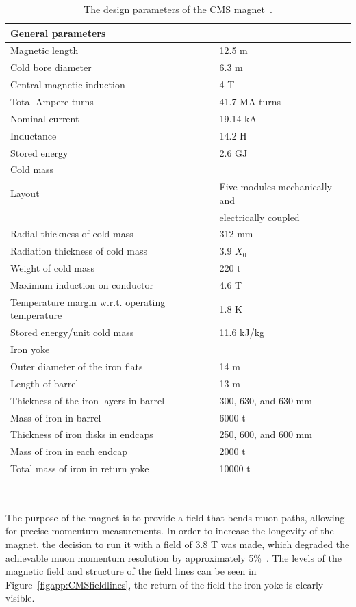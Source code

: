 \begin{table}[!Hhtbp]
\centering
\begin{tabular}{ll}
\hline
\hline
{General parameters} & {}\\
\hline
{Magnetic length} & {12.5 m}\\
{Cold bore diameter} & {6.3 m}\\
{Central magnetic induction} & {4 T}\\
{Total Ampere-turns} & {41.7 MA-turns}\\
{Nominal current} & {19.14 kA}\\
{Inductance} & {14.2 H}\\
{Stored energy} & {2.6 GJ}\\
\hline
\hline
{Cold mass} & {}\\
\hline
{Layout} & {Five modules mechanically and}\\
{} & {electrically coupled}\\
{Radial thickness of cold mass} & {312 mm}\\
{Radiation thickness of cold mass} & {3.9 $X_0$}\\
{Weight of cold mass} & {220 t}\\
{Maximum induction on conductor} & {4.6 T}\\
{Temperature margin w.r.t. operating temperature} & {1.8 K}\\
{Stored energy/unit cold mass} & {11.6 kJ/kg}\\
\hline
\hline
{Iron yoke} & {}\\
\hline
{Outer diameter of the iron flats} & {14 m}\\
{Length of barrel} & {13 m}\\
{Thickness of the iron layers in barrel} & {300, 630, and 630 mm}\\
{Mass of iron in barrel} & {6000 t}\\
{Thickness of iron disks in endcaps} & {250, 600, and 600 mm}\\
{Mass of iron in each endcap} & {2000 t}\\
{Total mass of iron in return yoke} & {10000 t}\\
\hline
\end{tabular}
\\
\caption[Parameters of the CMS magnet.]{The design parameters of the CMS magnet~\cite{CMSdetector}.}
\label{tab:CMSmagnetparams}
\end{table}

The purpose of the magnet is to provide a field that bends muon paths, allowing for precise momentum measurements.  In order to increase the longevity of the magnet, the decision to run it with a field of 3.8 T was made, which degraded the achievable muon momentum resolution by approximately 5\%~\cite{CMSperformance}.  The levels of the magnetic field and structure of the field lines can be seen in Figure~\ref{figapp:CMSfieldlines}, the return of the field the iron yoke is clearly visible.  



